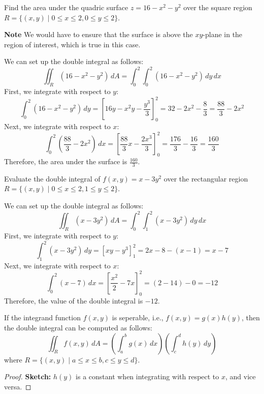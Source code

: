 \documentclass[11pt]{report}
\begin{document}
\begin{example}
    Find the area under the quadric surface $z = 16 - x^2 - y^2$ over the square region $R = \{ (x,y) \mid 0 \le x \le 2, 0 \le y \le 2\}$.

    \textbf{Note} We would have to ensure that the surface is above the $xy$-plane in the region of interest, which is true in this case.

    We can set up the double integral as follows:
    $$
        \iint_R (16 - x^2 - y^2) \, dA = \int_0^2 \int_0^2 (16 - x^2
        - y^2) \, dy \, dx
    $$
    First, we integrate with respect to $y$:
    $$
        \int_0^2 (16 - x^2 - y^2) \, dy = \left[ 16y - x^2y - \frac{y^3}{3} \right]_0^2 = 32 - 2x^2 - \frac{8}{3} = \frac{88}{3} - 2x^2
    $$
    Next, we integrate with respect to $x$:
    $$
        \int_0^2 \left( \frac{88}{3} - 2x^2 \right) \, dx = \left[ \frac{88}{3}x - \frac{2x^3}{3} \right]_0^2 = \frac{176}{3} - \frac{16}{3} = \frac{160}{3}
    $$
    Therefore, the area under the surface is $\frac{160}{3}$.

\end{example}

\begin{example}
    Evaluate the double integral of $f(x,y) = x - 3y^2$ over the rectangular region $R = \{ (x,y) \mid 0 \le x \le 2, 1 \le y \le 2\}$.

    We can set up the double integral as follows:
    $$
        \iint_R (x - 3y^2) \, dA = \int_0^2 \int_1^2 (x - 3y^2) \, dy \, dx
    $$
    First, we integrate with respect to $y$:
    $$
        \int_1^2 (x - 3y^2) \, dy = \left[ xy - y^3 \right]_1^2 = 2x - 8 - (x - 1) = x - 7
    $$
    Next, we integrate with respect to $x$:
    $$
        \int_0^2 (x - 7) \, dx = \left[ \frac{x^2}{2} - 7x \right]_0^2 = \left( 2 - 14 \right) - 0 = -12
    $$
    Therefore, the value of the double integral is $-12$.
\end{example}

\begin{theorem}
    If the integrand function $f(x,y)$ is seperable, i.e., $f(x,y) = g(x)h(y)$, then the double integral can be computed as follows:
    \begin{equation}
        \iint_R f(x,y) \, dA = \left( \int_a^b g(x) \, dx \right) \left( \int_c^d h(y) \, dy \right)
    \end{equation}
    where $R = \{ (x,y) \mid a \le x \le b, c \le y \le d \}$.
\end{theorem}
\begin{proof}
    \textbf{Sketch:} $h(y)$ is a constant when integrating with respect to $x$, and vice versa.
\end{proof}
\end{document}
